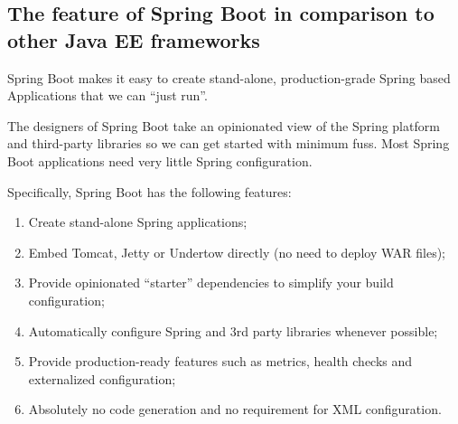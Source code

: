 \documentclass[./report.tex]{subfiles}
\begin{document}
\subsection{The feature of Spring Boot in comparison to other Java EE frameworks}
Spring Boot makes it easy to create stand-alone, production-grade Spring based Applications that we can ``just run''.
\par
The designers of Spring Boot take an opinionated view of the Spring platform and third-party libraries so we can get started with minimum fuss. Most Spring Boot applications need very little Spring configuration.
\par
Specifically, Spring Boot has the following features:
\begin{enumerate}
  \item Create stand-alone Spring applications;
  \item Embed Tomcat, Jetty or Undertow directly (no need to deploy WAR files);
  \item Provide opinionated ``starter'' dependencies to simplify your build configuration;
  \item Automatically configure Spring and 3rd party libraries whenever possible;
  \item Provide production-ready features such as metrics, health checks and externalized configuration;
  \item Absolutely no code generation and no requirement for XML configuration.
\end{enumerate}
\end{document}
